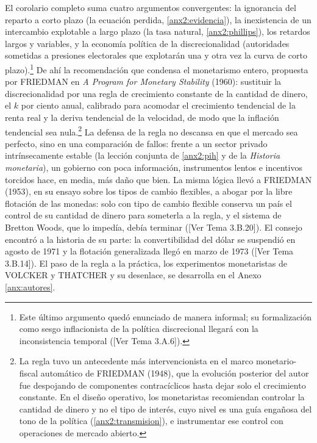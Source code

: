 \documentclass[10pt,a4paper]{article}
\newcommand{\authorfont}[1]{{\fontfamily{EBGaramond-TLF}\selectfont #1}}
\begin{document}
El corolario completo suma cuatro argumentos convergentes: la ignorancia del reparto a corto plazo (la ecuación perdida, \ref{anx2:evidencia}), la inexistencia de un intercambio explotable a largo plazo (la tasa natural, \ref{anx2:phillips}), los retardos largos y variables, y la economía política de la discrecionalidad (autoridades sometidas a presiones electorales que explotarán una y otra vez la curva de corto plazo).\footnote{%
    Este último argumento quedó enunciado de manera informal; su formalización como sesgo inflacionista de la política discrecional llegará con la inconsistencia temporal ([\authorfont{Ver Tema 3.A.6}]).
} De ahí la recomendación que condensa el monetarismo entero, propuesta por FRIEDMAN en \textit{A Program for Monetary Stability} (1960): sustituir la discrecionalidad por una regla de crecimiento constante de la cantidad de dinero, el $k$ por ciento anual, calibrado para acomodar el crecimiento tendencial de la renta real y la deriva tendencial de la velocidad, de modo que la inflación tendencial sea nula.\footnote{%
    La regla tuvo un antecedente más intervencionista en el marco monetario-fiscal automático de FRIEDMAN (1948), que la evolución posterior del autor fue despojando de componentes contracíclicos hasta dejar solo el crecimiento constante. En el diseño operativo, los monetaristas recomiendan controlar la cantidad de dinero y no el tipo de interés, cuyo nivel es una guía engañosa del tono de la política (\ref{anx2:transmision}), e instrumentar ese control con operaciones de mercado abierto.
} La defensa de la regla no descansa en que el mercado sea perfecto, sino en una comparación de fallos: frente a un sector privado intrínsecamente estable (la lección conjunta de \ref{anx2:pih} y de la \textit{Historia monetaria}), un gobierno con poca información, instrumentos lentos e incentivos torcidos hace, en media, más daño que bien. La misma lógica llevó a FRIEDMAN (1953), en su ensayo sobre los tipos de cambio flexibles, a abogar por la libre flotación de las monedas: solo con tipo de cambio flexible conserva un país el control de su cantidad de dinero para someterla a la regla, y el sistema de Bretton Woods, que lo impedía, debía terminar ([\authorfont{Ver Tema 3.B.20}]). El consejo encontró a la historia de su parte: la convertibilidad del dólar se suspendió en agosto de 1971 y la flotación generalizada llegó en marzo de 1973 ([\authorfont{Ver Tema 3.B.14}]). El paso de la regla a la práctica, los experimentos monetaristas de VOLCKER y THATCHER y su desenlace, se desarrolla en el Anexo \ref{anx:autores}.
\end{document}
